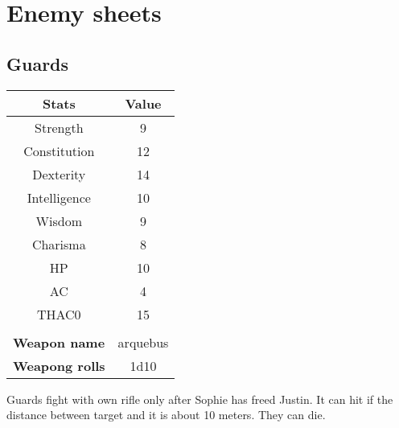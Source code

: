 \section{Enemy sheets}
\subsection{Guards}
\begin{table}[H]
  \centering
\begin{tabular}{|c|c|}
\hline
\rowcolor[HTML]{C0C0C0} 
\textbf{Stats} & \textbf{Value} \\ \hline
Strength & 9 \\ \hline
Constitution & 12 \\ \hline
Dexterity & 14 \\ \hline
Intelligence & 10 \\ \hline
Wisdom & 9 \\ \hline
Charisma & 8 \\ \hline
HP & 10 \\ \hline
AC & 4 \\ \hline
THAC0 & 15 \\ \hline
\multicolumn{1}{|l|}{} & \multicolumn{1}{l|}{} \\ \hline
\multicolumn{1}{|l|}{\cellcolor[HTML]{9B9B9B}\textbf{Weapon name}} & \multicolumn{1}{c|}{arquebus} \\ \hline
\multicolumn{1}{|l|}{\cellcolor[HTML]{9B9B9B}\textbf{Weapong rolls}} & \multicolumn{1}{c|}{1d10} \\ \hline
\end{tabular}
\end{table}
Guards fight with own rifle only after Sophie has freed Justin. It can hit if the distance between target and it is about 10 meters. They can die. 
